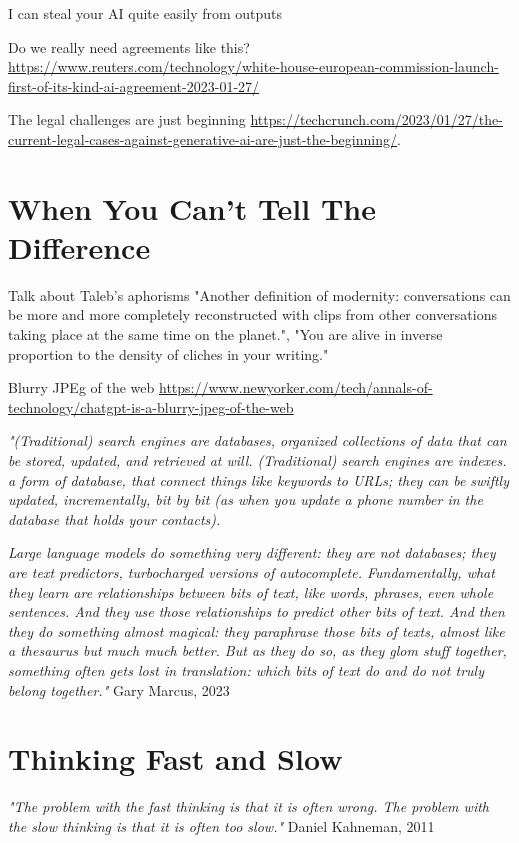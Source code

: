 I can steal your AI quite easily from outputs

Do we really need agreements like this? \url{https://www.reuters.com/technology/white-house-european-commission-launch-first-of-its-kind-ai-agreement-2023-01-27/}

The legal challenges are just beginning \url{https://techcrunch.com/2023/01/27/the-current-legal-cases-against-generative-ai-are-just-the-beginning/}.

\section{When You Can't Tell The Difference}

Talk about Taleb's aphorisms "Another definition of modernity: conversations can be more and more completely reconstructed with clips from other conversations taking place at the same time on the planet.", "You are alive in inverse proportion to the density of cliches in your writing."

Blurry JPEg of the web \url{https://www.newyorker.com/tech/annals-of-technology/chatgpt-is-a-blurry-jpeg-of-the-web}

\textit{"(Traditional) search engines are databases, organized collections of data that can be stored, updated, and retrieved at will. (Traditional) search engines are indexes. a form of database, that connect things like keywords to URLs; they can be swiftly updated, incrementally, bit by bit (as when you update a phone number in the database that holds your contacts).}

\textit{Large language models do something very different: they are not databases; they are text predictors, turbocharged versions of autocomplete. Fundamentally, what they learn are relationships between bits of text, like words, phrases, even whole sentences. And they use those relationships to predict other bits of text. And then they do something almost magical: they paraphrase those bits of texts, almost like a thesaurus but much much better. But as they do so, as they glom stuff together, something often gets lost in translation: which bits of text do and do not truly belong together."} Gary Marcus, 2023 \cite{marcus2023}


\section{Thinking Fast and Slow}

\textit{"The problem with the fast thinking is that it is often wrong. The problem with the slow thinking is that it is often too slow."} Daniel Kahneman, 2011 \cite{Kahneman2011}


